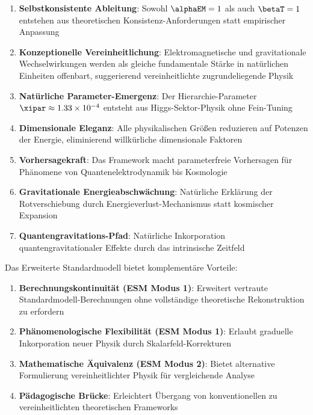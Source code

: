 	\begin{enumerate}
		\item \textbf{Selbstkonsistente Ableitung}: Sowohl $\alphaEM = 1$ als auch $\betaT = 1$ entstehen aus theoretischen Konsistenz-Anforderungen statt empirischer Anpassung
		
		\item \textbf{Konzeptionelle Vereinheitlichung}: Elektromagnetische und gravitationale Wechselwirkungen werden als gleiche fundamentale Stärke in natürlichen Einheiten offenbart, suggerierend vereinheitlichte zugrundeliegende Physik
		
		\item \textbf{Natürliche Parameter-Emergenz}: Der Hierarchie-Parameter $\xipar \approx 1.33 \times 10^{-4}$ entsteht aus Higgs-Sektor-Physik ohne Fein-Tuning
		
		\item \textbf{Dimensionale Eleganz}: Alle physikalischen Größen reduzieren auf Potenzen der Energie, eliminierend willkürliche dimensionale Faktoren
		
		\item \textbf{Vorhersagekraft}: Das Framework macht parameterfreie Vorhersagen für Phänomene von Quantenelektrodynamik bis Kosmologie
		
		\item \textbf{Gravitationale Energieabschwächung}: Natürliche Erklärung der Rotverschiebung durch Energieverlust-Mechanismus statt kosmischer Expansion
		
		\item \textbf{Quantengravitations-Pfad}: Natürliche Inkorporation quantengravitationaler Effekte durch das intrinsische Zeitfeld
	\end{enumerate}
	
	Das Erweiterte Standardmodell bietet komplementäre Vorteile:
	
	\begin{enumerate}
		\item \textbf{Berechnungskontinuität (ESM Modus 1)}: Erweitert vertraute Standardmodell-Berechnungen ohne vollständige theoretische Rekonstruktion zu erfordern
		
		\item \textbf{Phänomenologische Flexibilität (ESM Modus 1)}: Erlaubt graduelle Inkorporation neuer Physik durch Skalarfeld-Korrekturen
		
		\item \textbf{Mathematische Äquivalenz (ESM Modus 2)}: Bietet alternative Formulierung vereinheitlichter Physik für vergleichende Analyse
		
		\item \textbf{Pädagogische Brücke}: Erleichtert Übergang von konventionellen zu vereinheitlichten theoretischen Frameworks
	\end{enumerate}
	
